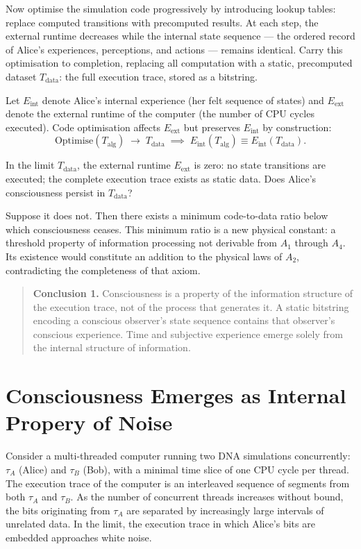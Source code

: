 \documentclass[11pt]{article}
\begin{document}
Now optimise the simulation code progressively by introducing lookup tables: replace
computed transitions with precomputed results. At each step, the external
runtime decreases while the internal state sequence --- the ordered record of
Alice's experiences, perceptions, and actions --- remains identical. Carry
this optimisation to completion, replacing all computation with a static,
precomputed dataset $T_{\mathrm{data}}$: the full execution trace, stored as
a bitstring.

Let $E_{\mathrm{int}}$ denote Alice's internal experience (her felt sequence
of states) and $E_{\mathrm{ext}}$ denote the external runtime of the
computer (the number of CPU cycles executed). Code optimisation affects
$E_{\mathrm{ext}}$ but preserves $E_{\mathrm{int}}$ by construction:
\[
\mathrm{Optimise}(T_{\mathrm{alg}}) \;\rightarrow\; T_{\mathrm{data}}
\;\implies\;
E_{\mathrm{int}}(T_{\mathrm{alg}}) \equiv E_{\mathrm{int}}(T_{\mathrm{data}}).
\]

In the limit $T_{\mathrm{data}}$, the external runtime $E_{\mathrm{ext}}$
is zero: no state transitions are executed; the complete execution trace
exists as static data. Does Alice's consciousness persist in $T_{\mathrm{data}}$?

Suppose it does not. Then there exists a minimum code-to-data ratio below
which consciousness ceases. This minimum ratio is a new physical constant:
a threshold property of information processing not derivable from $A_1$
through $A_4$. Its existence would constitute an addition to the physical
laws of $A_2$, contradicting the completeness of that axiom.

\begin{quote}
  \textbf{Conclusion 1.} Consciousness is a property of the information
  structure of the execution trace, not of the process that generates it.
  A static bitstring encoding a conscious observer's state sequence contains
  that observer's conscious experience. Time and subjective experience emerge
  solely from the internal structure of information.
\end{quote}


\section{Consciousness Emerges as Internal Propery of Noise}

Consider a multi-threaded computer running two DNA simulations concurrently:
$\tau_A$ (Alice) and $\tau_B$ (Bob), with a minimal time slice of one CPU
cycle per thread. The execution trace of the computer is an interleaved
sequence of segments from both $\tau_A$ and $\tau_B$. As the number of
concurrent threads increases without bound, the bits originating from
$\tau_A$ are separated by increasingly large intervals of unrelated data.
In the limit, the execution trace in which Alice's bits are embedded
approaches white noise.
\end{document}
